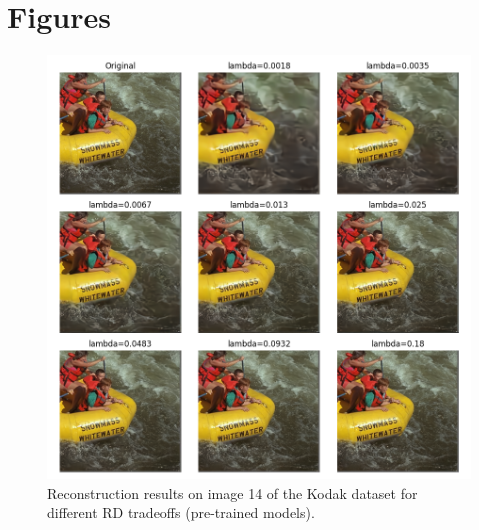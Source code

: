 \chapter{Figures}

\begin{figure}
    \centering
    \includegraphics[width=15cm]{../img/bdpsnr_kodak_14_pretrained.png}
    \caption[Reconstruction results on image 14 of the Kodak dataset for different RD tradeoffs (pre-trained models).]{Reconstruction results on image 14 of the Kodak dataset for different RD tradeoffs (pre-trained models).}
    \label{appendix:bdpsnr_1:a}
\end{figure}

